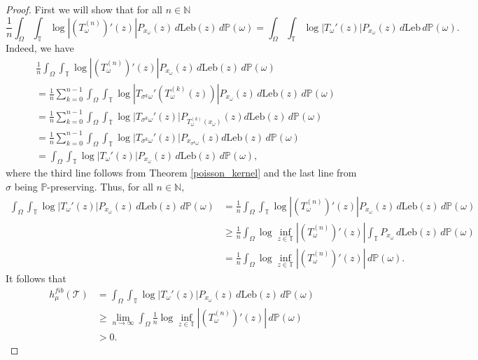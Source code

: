 \documentclass[12pt,reqno]{amsart}
\numberwithin{theorem}{section}
\begin{document}
\begin{proof}
    First we will show that for all $n\in\mathbb{N}$ $$\frac{1}{n}\int_{\Omega}\int_{\mathbb{T}}\log|(T_{\omega}^{(n)})'(z)|P_{x_{\omega}}(z)\,d\text{Leb}(z)\,d\mathbb{P}(\omega)=\int_{\Omega}\int_{\mathbb{T}}\log|T_{\omega}'(z)|P_{x_{\omega}}(z)\,d\text{Leb}\,d\mathbb{P}(\omega).$$ Indeed, we have \begin{align*}
        &\frac{1}{n}\int_{\Omega}\int_{\mathbb{T}}\log|(T_{\omega}^{(n)})'(z)|P_{x_{\omega}}(z)\,d\text{Leb}(z)\,d\mathbb{P}(\omega)\\&=\frac{1}{n}\sum_{k=0}^{n-1}\int_{\Omega}\int_{\mathbb{T}}\log|T_{\sigma^{k}\omega}'(T_{\omega}^{(k)}(z))|P_{x_{\omega}}(z)\,d\text{Leb}(z)\,d\mathbb{P}(\omega)\\&=\frac{1}{n}\sum_{k=0}^{n-1}\int_{\Omega}\int_{\mathbb{T}}\log|T_{\sigma^{k}\omega}'(z)|P_{T_{\omega}^{(k)}(x_{\omega})}(z)d\text{Leb}(z)\,d\mathbb{P}(\omega)\\&=\frac{1}{n}\sum_{k=0}^{n-1}\int_{\Omega}\int_{\mathbb{T}}\log|T_{\sigma^{k}\omega}'(z)|P_{x_{\sigma^{k}\omega}}(z)d\text{Leb}(z)\,d\mathbb{P}(\omega)\\&=\int_{\Omega}\int_{\mathbb{T}}\log|T_{\omega}'(z)|P_{x_{\omega}}(z)\,d\text{Leb}(z)\,d\mathbb{P}(\omega),
    \end{align*} where the third line follows from Theorem \ref{poisson_kernel} and the last line from $\sigma$ being $\mathbb{P}$-preserving. Thus, for all $n\in\mathbb{N},$ \begin{align*}
        \int_{\Omega}\int_{\mathbb{T}}\log|T_{\omega}'(z)|P_{x_{\omega}}(z)\,d\text{Leb}(z)\,d\mathbb{P}(\omega)&=\frac{1}{n}\int_{\Omega}\int_{\mathbb{T}}\log|(T_{\omega}^{(n)})'(z)|P_{x_{\omega}}(z)\,d\text{Leb}(z)\,d\mathbb{P}(\omega)\\&\ge\frac{1}{n}\int_{\Omega}\log\inf_{z\in\mathbb{T}}|(T_{\omega}^{(n)})'(z)|\int_{\mathbb{T}}P_{x_{\omega}}\,d\text{Leb}(z)\,d\mathbb{P}(\omega)\\&=\frac{1}{n}\int_{\Omega}\log\inf_{z\in\mathbb{T}}|(T_{\omega}^{(n)})'(z)|\,d\mathbb{P}(\omega).
    \end{align*} It follows that \begin{align*}
        h_{\mu}^{fib}(\mathcal{T})&=\int_{\Omega}\int_{\mathbb{T}}\log|T_{\omega}'(z)|P_{x_{\omega}}(z)\,d\text{Leb}(z)\,d\mathbb{P}(\omega)\\&\ge\lim_{n\to\infty}\int_{\Omega}\frac{1}{n}\log\inf_{z\in\mathbb{T}}|(T_{\omega}^{(n)})'(z)|\,d\mathbb{P}(\omega)\\&>0.
    \end{align*} 
\end{proof}
\end{document}
